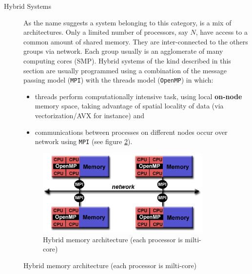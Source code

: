 \begin{description}
\begin{description}
	\item[Hybrid Systems] As the name suggests a system belonging to this category, is a mix of architectures. Only a limited number of  processors, say $N$, have access to a common amount of shared memory. They are  inter-connected to the others groups via network. Each group  usually is an agglomerate of many computing cores (SMP).
		Hybrid systems of the kind described in this section are usually programmed using a combination of the message passing model (\texttt{MPI}) with the threads model (\texttt{OpenMP}) in which:
		\begin{itemize}
			\item threads perform computationally intensive task, using local
			\textbf{on-node} memory space, taking advantage of spatial locality of data (via vectorization/AVX for instance) and 
			\item communications between processes on different nodes occur over network using \texttt{MPI} (see figure \ref{fig:hybridMemory}).
	\end{itemize} 
\end{description}
 
 \begin{figure}
 	\centering
 	\begin{subfigure}{0.55\textwidth}
 		\centering
 			\caption{Hybrid memory architecture (each processor is milti-core)}
 		\label{fig:hybridMemory}
 		\includegraphics[width=0.95\textwidth]{./images/parallel_programming/hybrid_model}
 	

\end{subfigure}
\end{figure}
\end{description}
